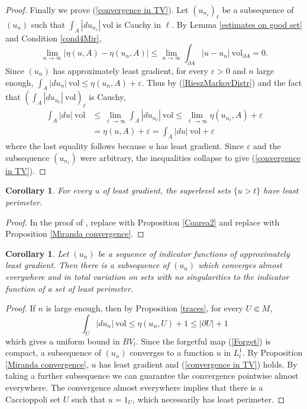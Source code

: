 \documentclass[reqno,12pt,letterpaper]{amsart}
\newcommand{\vol}{\mathrm{vol}}
\newtheorem{corollary}[theorem]{Corollary}
\theoremstyle{definition}
\numberwithin{equation}{section}
\begin{document}
\begin{proof}
Finally we prove (\ref{convergence in TV}).
Let $(u_{n_\ell})_\ell$ be a subsequence of $(u_n)$ such that $\int_A |du_{n_\ell}| ~\vol$ is Cauchy in $\ell$.
By Lemma \ref{estimates on good set} and Condition \ref{cond4Mir},
$$\lim_{n \to \infty} |\eta(u, A) - \eta(u_n, A)| \leq \lim_{n \to \infty} \int_{\partial A} |u - u_n| ~\vol_{\partial A} = 0.$$
Since $(u_n)$ has approximately least gradient, for every $\varepsilon > 0$ and $n$ large enough, $\int_A |du_n| ~\vol \leq \eta(u_n, A) + \varepsilon$.
Thus by (\ref{RieszMarkovDistr}) and the fact that $(\int_A |du_{n_\ell}| ~\vol)_\ell$ is Cauchy,
\begin{align*}
\int_A |du| ~\vol &\leq \lim_{\ell \to \infty} \int_A |du_{n_\ell}| ~\vol \leq \lim_{\ell \to \infty} \eta(u_{n_\ell}, A) + \varepsilon\\
&= \eta(u, A) + \varepsilon = \int_A |du| ~\vol + \varepsilon
\end{align*}
where the last equality follows because $u$ has least gradient.
Since $\varepsilon$ and the subsequence $(u_{n_\ell})$ were arbitrary, the inequalities collapse to give (\ref{convergence in TV}).
\end{proof}

\begin{corollary}\label{level sets are minimal}
For every $u$ of least gradient, the superlevel sets $\{u > t\}$ have least perimeter.
\end{corollary}
\begin{proof}
In the proof of \cite[Theorem 1]{BOMBIERI1969}, replace \cite[Theorem 1.6]{Miranda66} with Proposition \ref{Coarea2} and replace \cite[Theorem 3]{Miranda67} with Proposition \ref{Miranda convergence}.
\end{proof}

\begin{corollary}\label{compactness}
Let $(u_n)$ be a sequence of indicator functions of approximately least gradient.
Then there is a subsequence of $(u_n)$ which converges almost everywhere and in total variation on sets with no singularities to the indicator function of a set of least perimeter.
\end{corollary}
\begin{proof}
If $n$ is large enough, then by Proposition \ref{traces}, for every $U \Subset M$,
$$\int_U |du_n| ~\vol \leq \eta(u_n, U) + 1 \leq |\partial U| + 1$$
which gives a uniform bound in $BV_l$.
Since the forgetful map (\ref{Forget}) is compact, a subsequence of $(u_n)$ converges to a function $u$ in $L^1_l$.
By Proposition \ref{Miranda convergence}, $u$ has least gradient and (\ref{convergence in TV}) holds.
By taking a further subsequence we can guarantee the convergence pointwise almost everywhere.
The convergence almost everywhere implies that there is a Caccioppoli set $U$ such that $u = 1_U$, which necessarily has least perimeter.
\end{proof}
\end{document}
